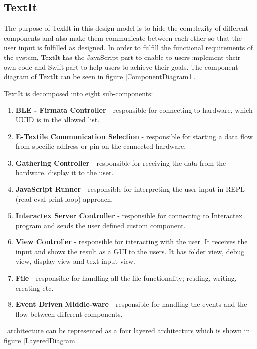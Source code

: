 \subsection{TextIt}
The purpose of TextIt in this design model is to hide the complexity of different components and also make them communicate between each other so that the user input is fulfilled as designed. In order to fulfill the functional requirements of the system, TextIt has the JavaScript part to enable to users implement their own code and Swift part to help users to achieve their goals. The component diagram of TextIt can be seen in figure \ref{ComponentDiagram1}.



 TextIt is decomposed into eight sub-components:
\begin{enumerate}
\item \textbf{BLE - Firmata Controller} - responsible for connecting to hardware, which UUID is in the allowed list.
\item \textbf{E-Textile Communication Selection} - responsible for starting a data flow from specific address or pin on the connected hardware.
\item \textbf{Gathering Controller} - responsible for receiving the data from the hardware, display it to the user.
\item \textbf{JavaScript Runner} - responsible for interpreting the user input in REPL (read-eval-print-loop) approach. 
\item \textbf{Interactex Server Controller} - responsible for connecting to Interactex program and sends the user defined custom component.
\item \textbf{View Controller} - responsible for interacting with the user. It receives the input and shows the result as a GUI to the users. It has folder view, debug view, display view and text input view.
\item \textbf{File} - responsible for handling all the file functionality; reading, writing, creating etc.
\item \textbf{Event Driven Middle-ware} - responsible for handling the events and the flow between different components.

\end{enumerate}

\seif\ architecture can be represented as a four layered architecture which is shown in figure \ref{LayeredDiagram}. 

